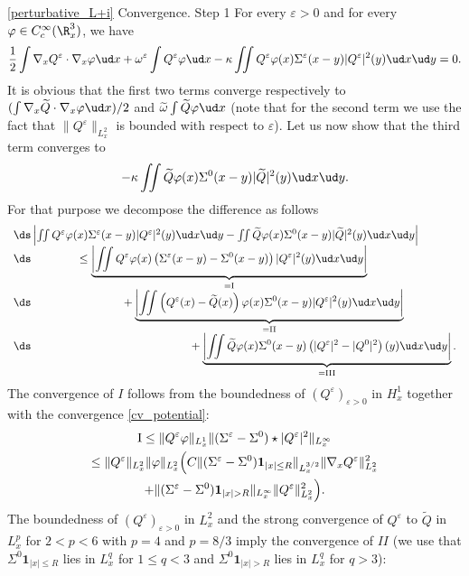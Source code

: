 \begin{ProofOf}{\eqref{perturbative_L+i} Convergence. Step 1}
For every $\varepsilon>0$ and for every $\varphi\in C_{c}^{\infty}(\R_{x}^{3})$, we have
\[
\frac{1}{2}\int\nabla_{x}Q^{\varepsilon}\cdot\nabla_{x}\varphi\ud x+\omega^{\varepsilon}\int Q^{\varepsilon}\varphi\ud x-\kappa\iint Q^{\varepsilon}\varphi(x)\Sigma^{\varepsilon}(x-y)|Q^{\varepsilon}|^{2}(y)\ud x\ud y=0.
\]
It is obvious that the first two terms converge respectively to $(\int\nabla_{x}\widetilde{Q}\cdot\nabla_{x}\varphi\ud x)/2$ and $\widetilde{\omega}\int\widetilde{Q}\varphi\ud x$ (note that for the second term we use the fact that $\|Q^{\varepsilon}\|_{L_{x}^{2}}$ is bounded with respect to $\varepsilon$). Let us now show that the third term converges to
\[
-\kappa\iint\widetilde{Q}\varphi(x)\Sigma^{0}(x-y)|\widetilde{Q}|^{2}(y)\ud x\ud y.
\]
For that purpose we decompose the difference as follows
\[
\begin{array}{l}
\ds \left|\iint Q^{\varepsilon}\varphi(x)\Sigma^{\varepsilon}(x-y)|Q^{\varepsilon}|^{2}(y)\ud x\ud y-\iint\widetilde{Q}\varphi(x)\Sigma^{0}(x-y)|\widetilde{Q}|^{2}(y)\ud x\ud y\right|\\
\ds\qquad\qquad \leq\underbrace{\left|\iint Q^{\varepsilon}\varphi(x)\left(\Sigma^{\varepsilon}(x-y)-\Sigma^{0}(x-y)\right)|Q^{\varepsilon}|^{2}(y)\ud x\ud y\right|}_{=\textup{I}}\\
\ds\qquad\qquad\qquad \qquad+\underbrace{\left|\iint \left(Q^{\varepsilon}(x)-\widetilde{Q}(x)\right)\varphi(x)\Sigma^{0}(x-y)|Q^{\varepsilon}|^{2}(y)\ud x\ud y\right|}_{=\textup{II}}\\
\ds\qquad\qquad\qquad \qquad\qquad\qquad \qquad +\underbrace{\biggl|\iint \widetilde{Q}\varphi(x)\Sigma^{0}(x-y)\left(|Q^{\varepsilon}|^{2}-|Q^{0}|^{2}\right)(y)\ud x\ud y\biggr|}_{=\textup{III}}.
\end{array}
\]
The convergence of $I$ follows from the boundedness of $(Q^{\varepsilon})_{\varepsilon>0}$ in $H_{x}^{1}$ together with the convergence \eqref{cv_potential}:
\begin{multline*}
\textup{I}\leq\|Q^{\varepsilon}\varphi\|_{L_{x}^{1}}\|(\Sigma^{\varepsilon}-\Sigma^{0})\star|Q^{\varepsilon}|^{2}\|_{L_{x}^{\infty}}\\
\leq\|Q^{\varepsilon}\|_{L_{x}^{2}}\|\varphi\|_{L_{x}^{2}}\Bigl(C\|(\Sigma^{\varepsilon}-\Sigma^{0})\mathbf{1}_{|x|\leq R}\|_{L_{x}^{3/2}}\|\nabla_{x}Q^{\varepsilon}\|_{L_{x}^{2}}^{2}
\\+\|(\Sigma^{\varepsilon}-\Sigma^{0})\mathbf{1}_{|x|>R}\|_{L_{x}^{\infty}}\|Q^{\varepsilon}\|_{L_{x}^{2}}^{2}\Bigr).
\end{multline*}
The boundedness of $(Q^{\varepsilon})_{\varepsilon>0}$ in $L_{x}^{2}$ and the strong convergence of $Q^{\varepsilon}$ to $\widetilde{Q}$ in $L_{x}^{p}$ for $2<p<6$ with $p=4$ and $p=8/3$ imply the convergence of $II$ (we use that $\Sigma^{0}\mathbf{1}_{|x|\leq R}$ lies in $L_{x}^{q}$ for $1\leq q<3$ and $\Sigma^{0}\mathbf{1}_{|x|>R}$ lies in $L_{x}^{q}$ for $q>3$):

\end{ProofOf}
